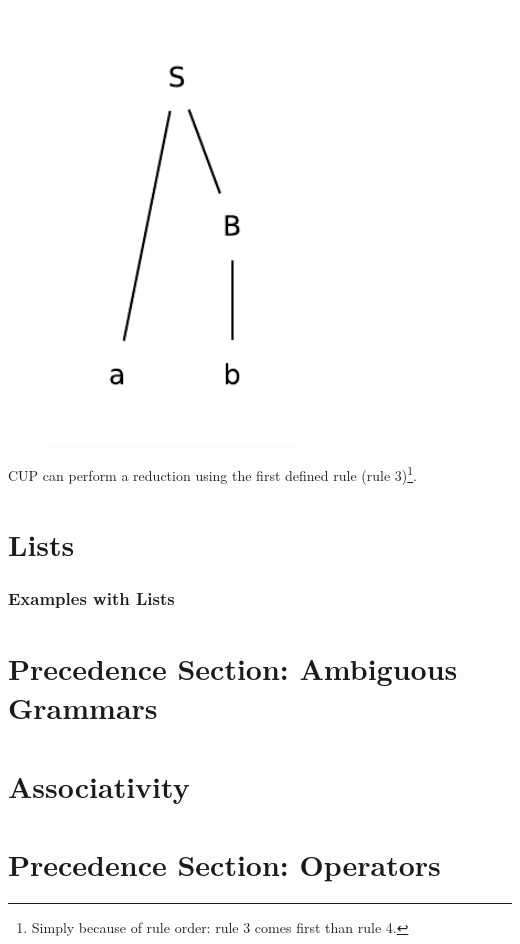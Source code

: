 \begin{enumerate}
\begin{figure}[H]
        \centerline{\includegraphics[width=0.6\textwidth]{img/26.pdf}}
    \end{figure}
\end{enumerate}
CUP can perform a reduction using the first defined rule (rule 3)\footnote{Simply because of rule order: rule 3 comes first than rule 4.}.

\section{Lists}
\subsubsection{Examples with Lists}

\section{Precedence Section: Ambiguous Grammars}

\section{Associativity}

\section{Precedence Section: Operators}

